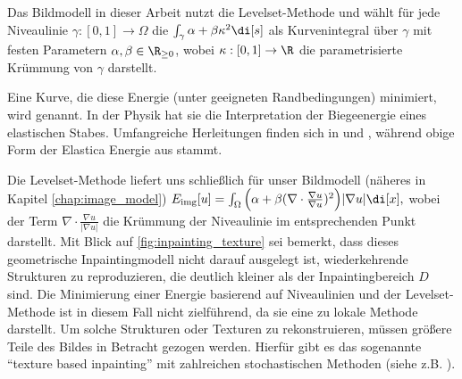 \documentclass{mythesis}
\begin{document}
Das Bildmodell in dieser Arbeit nutzt die Levelset-Methode und wählt für jede Niveaulinie $\gamma:[0,1] \to \Omega$ die 
\begin{math}
    \int_{\gamma} \alpha + \beta \kappa^2 \di[s]
\end{math}
als Kurvenintegral über $\gamma$ mit festen Parametern $\alpha, \beta \in \R_{\ge 0}$, wobei $\kappa: [0,1] \to \R$ die parametrisierte Krümmung von $\gamma$ darstellt.

Eine Kurve, die diese Energie (unter geeigneten Randbedingungen) minimiert, wird  genannt.
In der Physik hat sie die Interpretation der Biegeenergie eines elastischen Stabes.
Umfangreiche Herleitungen finden sich in \cite{love1920treatise} und \cite{antman2005problems}, während obige Form der Elastica Energie aus \cite{birkhoff1965nonlinear} stammt.

Die Levelset-Methode liefert uns schließlich für unser Bildmodell (näheres in Kapitel \ref{chap:image_model})
\begin{math}
    \Eimg[u] = \int_{\Omega} \Big(\alpha + \beta (\nabla \cdot \frac{\nabla u}{\nabla u})^2\Big)|\nabla u| \di[x],
\end{math}
wobei der Term $\nabla \cdot \frac{\nabla u}{|\nabla u|}$ die Krümmung der Niveaulinie im entsprechenden Punkt darstellt.
Mit Blick auf \ref{fig:inpainting_texture} sei bemerkt, dass dieses geometrische Inpaintingmodell nicht darauf ausgelegt ist, wiederkehrende Strukturen zu reproduzieren, die deutlich kleiner als der Inpaintingbereich $D$ sind.
Die Minimierung einer Energie basierend auf Niveaulinien und der Levelset-Methode ist in diesem Fall nicht zielführend, da sie eine zu lokale Methode darstellt.
Um solche Strukturen oder Texturen zu rekonstruieren, müssen größere Teile des Bildes in Betracht gezogen werden.
Hierfür gibt es das sogenannte “texture based inpainting” mit zahlreichen stochastischen Methoden (siehe z.B. \cite{criminisi2004region}).
\end{document}

